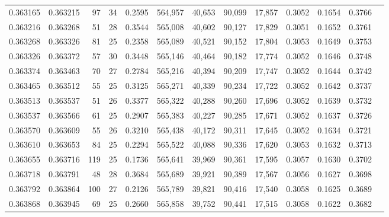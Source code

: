 \begin{tabular}{rrrrrrrrrrrrr}
0.363165 & 0.363215 &    97 &  34 &                                     0.2595 & 564,957 &  40,653 &  90,099 &  17,857 & 0.3052 & 0.1654 & 0.3766 \\
0.363216 & 0.363268 &    51 &  28 &                                     0.3544 & 565,008 &  40,602 &  90,127 &  17,829 & 0.3051 & 0.1652 & 0.3761 \\
0.363268 & 0.363326 &    81 &  25 &                                     0.2358 & 565,089 &  40,521 &  90,152 &  17,804 & 0.3053 & 0.1649 & 0.3753 \\
0.363326 & 0.363372 &    57 &  30 &                                     0.3448 & 565,146 &  40,464 &  90,182 &  17,774 & 0.3052 & 0.1646 & 0.3748 \\
0.363374 & 0.363463 &    70 &  27 &                                     0.2784 & 565,216 &  40,394 &  90,209 &  17,747 & 0.3052 & 0.1644 & 0.3742 \\
0.363465 & 0.363512 &    55 &  25 &                                     0.3125 & 565,271 &  40,339 &  90,234 &  17,722 & 0.3052 & 0.1642 & 0.3737 \\
0.363513 & 0.363537 &    51 &  26 &                                     0.3377 & 565,322 &  40,288 &  90,260 &  17,696 & 0.3052 & 0.1639 & 0.3732 \\
0.363537 & 0.363566 &    61 &  25 &                                     0.2907 & 565,383 &  40,227 &  90,285 &  17,671 & 0.3052 & 0.1637 & 0.3726 \\
0.363570 & 0.363609 &    55 &  26 &                                     0.3210 & 565,438 &  40,172 &  90,311 &  17,645 & 0.3052 & 0.1634 & 0.3721 \\
0.363610 & 0.363653 &    84 &  25 &                                     0.2294 & 565,522 &  40,088 &  90,336 &  17,620 & 0.3053 & 0.1632 & 0.3713 \\
0.363655 & 0.363716 &   119 &  25 &                                     0.1736 & 565,641 &  39,969 &  90,361 &  17,595 & 0.3057 & 0.1630 & 0.3702 \\
0.363718 & 0.363791 &    48 &  28 &                                     0.3684 & 565,689 &  39,921 &  90,389 &  17,567 & 0.3056 & 0.1627 & 0.3698 \\
0.363792 & 0.363864 &   100 &  27 &                                     0.2126 & 565,789 &  39,821 &  90,416 &  17,540 & 0.3058 & 0.1625 & 0.3689 \\
0.363868 & 0.363945 &    69 &  25 &                                     0.2660 & 565,858 &  39,752 &  90,441 &  17,515 & 0.3058 & 0.1622 & 0.3682 \\

\end{tabular}
